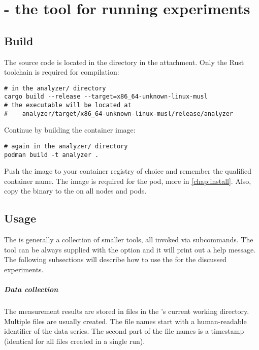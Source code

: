 \chapter{ - the tool for running experiments}
\label{chap:analyzer}

\section{Build}

The source code is located in the  directory in the attachment. Only the Rust toolchain is required for compilation:

\begin{verbatim}
# in the analyzer/ directory
cargo build --release --target=x86_64-unknown-linux-musl
# the executable will be located at 
#    analyzer/target/x86_64-unknown-linux-musl/release/analyzer
\end{verbatim}

Continue by building the container image:

\begin{verbatim}
# again in the analyzer/ directory
podman build -t analyzer .
\end{verbatim}

Push the image to your container registry of choice and remember the qualified container name. The image is required for the  pod, more in \cref{chap:install}. Also, copy the binary to the  on all nodes and pods.

\section{Usage}

The  is generally a collection of smaller tools, all invoked via subcommands. The tool can be always supplied with the  option and it will print out a help message. The following subsections will describe how to use the  for the discussed experiments.

\paragraph{Data collection} The measurement results are stored in files in the 's current working directory. Multiple files are usually created. The file names start with a human-readable identifier of the data series. The second part of the file names is a timestamp (identical for all files created in a single  run).


